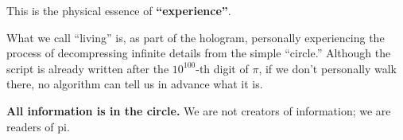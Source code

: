 This is the physical essence of \textbf{``experience''}.

What we call ``living'' is, as part of the hologram, personally experiencing the process of decompressing infinite details from the simple ``circle.'' Although the script is already written after the $10^{100}$-th digit of $\pi$, if we don't personally walk there, no algorithm can tell us in advance what it is.

\textbf{All information is in the circle.} We are not creators of information; we are readers of pi.

